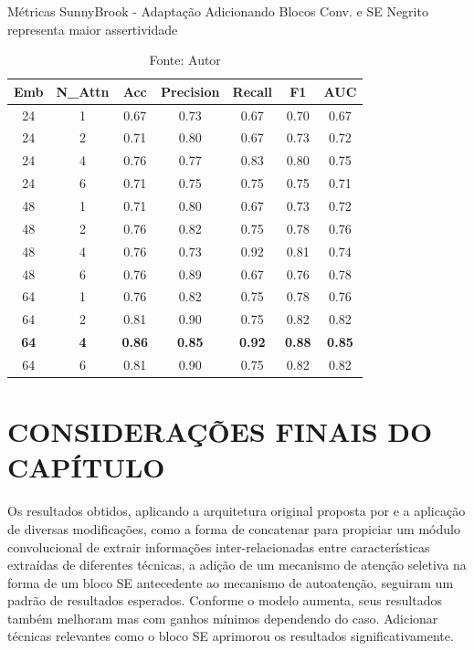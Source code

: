 \begin{table}[htbp]
\centering
\caption{Métricas SunnyBrook - Adaptação Adicionando Blocos Conv. e SE
\newline Negrito representa maior assertividade}
\begin{tabular}{ccccccc}
\toprule
\textbf{Emb} & \textbf{N\_Attn} & \textbf{Acc} & \textbf{Precision} & \textbf{Recall} & \textbf{F1} & \textbf{AUC} \\
\midrule
24 & 1 & 0.67 & 0.73 & 0.67 & 0.70 & 0.67 \\
24 & 2 & 0.71 & 0.80 & 0.67 & 0.73 & 0.72 \\
24 & 4 & 0.76 & 0.77 & 0.83 & 0.80 & 0.75 \\
24 & 6 & 0.71 & 0.75 & 0.75 & 0.75 & 0.71 \\
48 & 1 & 0.71 & 0.80 & 0.67 & 0.73 & 0.72 \\
48 & 2 & 0.76 & 0.82 & 0.75 & 0.78 & 0.76 \\
48 & 4 & 0.76 & 0.73 & 0.92 & 0.81 & 0.74 \\
48 & 6 & 0.76 & 0.89 & 0.67 & 0.76 & 0.78 \\
64 & 1 & 0.76 & 0.82 & 0.75 & 0.78 & 0.76 \\
64 & 2 & 0.81 & 0.90 & 0.75 & 0.82 & 0.82 \\
\textbf{64} & \textbf{4} & \textbf{0.86} & \textbf{0.85} & \textbf{0.92} & \textbf{0.88} & \textbf{0.85} \\
64 & 6 & 0.81 & 0.90 & 0.75 & 0.82 & 0.82 \\
\bottomrule
\end{tabular}
\caption*{Fonte: Autor}
\label{tab:metrics_sunny_se}
\end{table}

\section{CONSIDERAÇÕES FINAIS DO CAPÍTULO} 
\label{sec:cap6_consideracoes_finais}

Os resultados obtidos, aplicando a arquitetura original proposta por  e a aplicação de diversas modificações, como a forma de concatenar para propiciar um módulo convolucional de extrair informações inter-relacionadas entre características extraídas de diferentes técnicas, a adição de um mecanismo de atenção seletiva na forma de um bloco \gls{SE} antecedente ao mecanismo de autoatenção, seguiram um padrão de resultados esperados. Conforme o modelo aumenta, seus resultados também melhoram mas com ganhos mínimos dependendo do caso. Adicionar técnicas relevantes como o bloco \gls{SE} aprimorou os resultados significativamente.

